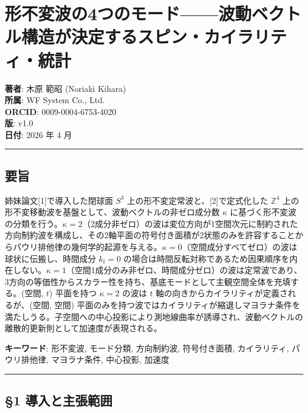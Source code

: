 \documentclass[
  a4paper,11pt]{ltjsarticle}
\theoremstyle{definition}
\theoremstyle{remark}
\begin{document}
\section{形不変波の4つのモード------波動ベクトル構造が決定するスピン・カイラリティ・統計}\label{ux5f62ux4e0dux5909ux6ce2ux306e4ux3064ux306eux30e2ux30fcux30c9ux6ce2ux52d5ux30d9ux30afux30c8ux30ebux69cbux9020ux304cux6c7aux5b9aux3059ux308bux30b9ux30d4ux30f3ux30abux30a4ux30e9ux30eaux30c6ux30a3ux7d71ux8a08}

\textbf{著者}: 木原 範昭 (Noriaki Kihara)\\
\textbf{所属}: WF System Co., Ltd.\\
\textbf{ORCID}: 0009-0004-6753-4020\\
\textbf{版}: v1.0\\
\textbf{日付}: 2026 年 4 月

\begin{center}\rule{0.5\linewidth}{0.5pt}\end{center}

\subsection{要旨}\label{ux8981ux65e8}

姉妹論文{[}1{]}で導入した閉球面 \(S^3\)
上の形不変定常波と、{[}2{]}で定式化した \(\mathbb{Z}^4\)
上の形不変移動波を基盤として、波動ベクトルの非ゼロ成分数 \(\kappa\)
に基づく形不変波の分類を行う。\(\kappa = 2\)（2成分非ゼロ）の波は変位方向が1空間次元に制約された方向制約波を構成し、その2軸平面の符号付き面積が2状態のみを許容することからパウリ排他律の幾何学的起源を与える。\(\kappa = 0\)（空間成分すべてゼロ）の波は球状に伝搬し、時間成分
\(k_t = 0\)
の場合は時間反転対称であるため因果順序を内在しない。\(\kappa = 1\)（空間1成分のみ非ゼロ、時間成分ゼロ）の波は定常波であり、3方向の等価性からスカラー性を持ち、基底モードとして主観空間全体を充填する。(空間,
\(t\)) 平面を持つ \(\kappa = 2\) の波は \(t\)
軸の向きからカイラリティが定義されるが、(空間, 空間)
平面のみを持つ波ではカイラリティが縮退しマヨラナ条件を満たしうる。子空間への中心投影により測地線曲率が誘導され、波動ベクトルの離散的更新則として加速度が表現される。

\textbf{キーワード}: 形不変波, モード分類, 方向制約波, 符号付き面積,
カイラリティ, パウリ排他律, マヨラナ条件, 中心投影, 加速度

\begin{center}\rule{0.5\linewidth}{0.5pt}\end{center}

\subsection{§1
導入と主張範囲}\label{ux5c0eux5165ux3068ux4e3bux5f35ux7bc4ux56f2}
\end{document}
